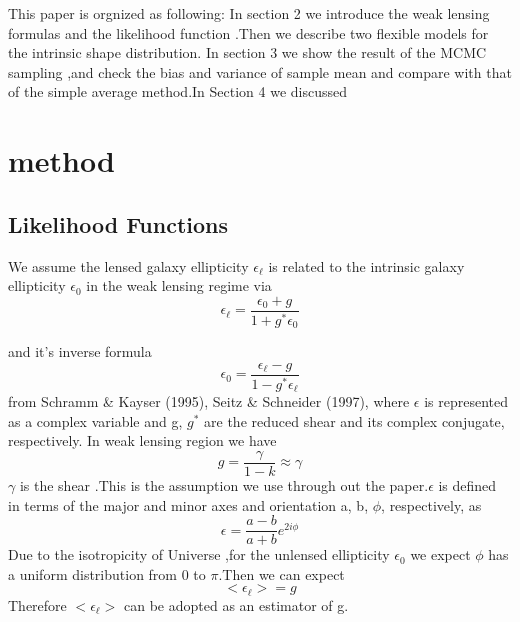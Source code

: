 \documentclass[useAMS,usenatbib]{mn2e}
\begin{document}
This paper is orgnized as following: In section 2 we introduce the
weak lensing formulas and the likelihood function .Then we describe
two flexible models for the intrinsic shape distribution. In section
3 we show the result of the MCMC sampling ,and check the bias and
variance of sample mean and compare with that of the simple average
method.In Section 4 we discussed




\section{method}

\label{sec:XXX}


\subsection{Likelihood Functions}

We assume the lensed galaxy ellipticity $\epsilon_{\ell}$ is related
to the intrinsic galaxy ellipticity $\epsilon_{0}$ in the weak lensing
regime via 
\begin{equation}
\epsilon_{\ell}=\frac{\epsilon_{0}+g}{1+g^{*}\epsilon_{0}}
\end{equation}


and it's inverse formula 
\begin{equation}
\epsilon_{0}=\frac{\epsilon_{\ell}-g}{1-g^{*}\epsilon_{\ell}}
\end{equation}
from Schramm \& Kayser (1995), Seitz \& Schneider (1997), where $\epsilon$
is represented as a complex variable and g, $g^{*}$ are the reduced
shear and its complex conjugate, respectively. In weak lensing region we have 
\begin{equation}
g=\frac{\gamma}{1-k}\approx\gamma
\end{equation}
$\gamma$ is the shear .This is the assumption we use through out
the paper.$\epsilon$ is defined in terms of the major and minor axes and orientation a, b, $\phi$,
respectively, as
\begin{equation}
\epsilon=\frac{a-b}{a+b}e^{2i\phi}
\end{equation}
Due to the isotropicity of Universe ,for the unlensed ellipticity $\epsilon_{0}$ 
we expect $\phi$ has a uniform distribution
from 0 to $\pi$.Then we can expect 
\begin{equation}
<\epsilon_{\ell}>=g
\end{equation}
Therefore $<\epsilon_{\ell}>$ can be adopted as an estimator of g.
\end{document}
